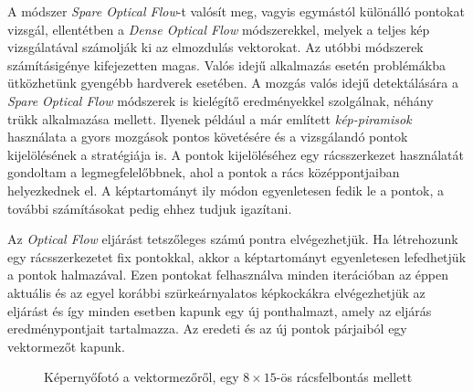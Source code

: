 A módszer \textit{Spare Optical Flow}-t valósít meg, vagyis egymástól különálló pontokat vizsgál, ellentétben a \textit{Dense Optical Flow} módszerekkel, melyek a teljes kép vizsgálatával számolják ki az elmozdulás vektorokat. \cite{bradski2008learning} Az utóbbi módszerek számításigénye kifejezetten magas. Valós idejű alkalmazás esetén problémákba ütközhetünk gyengébb hardverek esetében. A mozgás valós idejű detektálására a \textit{Spare Optical Flow} módszerek is kielégítő eredményekkel szolgálnak, néhány trükk alkalmazása mellett. Ilyenek például a már említett \textit{kép-piramisok} használata a gyors mozgások pontos követésére és a vizsgálandó pontok kijelölésének a stratégiája is. A pontok kijelöléséhez egy rácsszerkezet használatát gondoltam a legmegfelelőbbnek, ahol a pontok a rács középpontjaiban helyezkednek el. A képtartományt ily módon egyenletesen fedik le a pontok, a további számításokat pedig ehhez tudjuk igazítani.


Az \textit{Optical Flow} eljárást tetszőleges számú pontra elvégezhetjük. Ha létrehozunk egy rácsszerkezetet fix pontokkal, akkor a képtartományt egyenletesen lefedhetjük a pontok halmazával.
Ezen pontokat felhasználva minden iterációban az éppen aktuális és az egyel korábbi szürkeárnyalatos képkockákra elvégezhetjük az eljárást és így minden esetben kapunk egy új ponthalmazt, amely az eljárás eredménypontjait tartalmazza. Az eredeti és az új pontok párjaiból egy vektormezőt kapunk.

\begin{figure}[h]
\centering
{}
\caption{Képernyőfotó a vektormezőről, egy $8 \times 15$-ös rácsfelbontás mellett}
\label{fig:vectorfield}
\end{figure}

